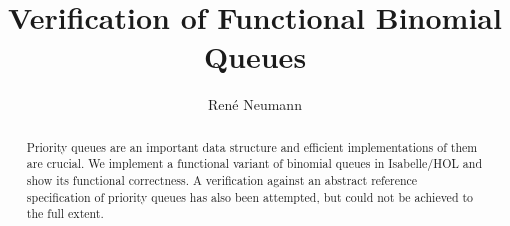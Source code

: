 \documentclass[fleqn]{llncs}
\title{Verification of Functional Binomial Queues}
\author{Ren\'{e} Neumann}
\institute{Technische Universit\"at M\"unchen, Institut f\"ur Informatik \\
  \url{http://www.in.tum.de/~neumannr/}}
\begin{document}
\maketitle

\begin{abstract}
Priority queues are an important data structure and efficient implementations of them are crucial.  We implement a functional variant of binomial queues in Isabelle/HOL and show its functional correctness.  A verification against an abstract reference specification of priority queues has also been attempted, but could not be achieved to the full extent.
\end{abstract}

\vspace*{1ex}



\vspace*{-3ex}



\end{document}
